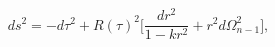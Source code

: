 \begin{equation}
\label{2eq1} ds^2 =-d\tau^2 +R(\tau)^2 \Big[ \frac{dr^2}{1-kr^2} +r^2 d\Omega^2_{n-1} \Big],
\end{equation}

